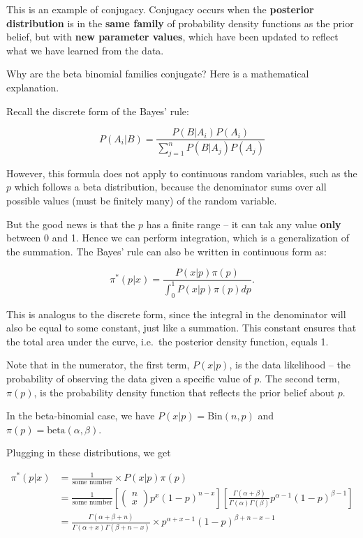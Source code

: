 \documentclass[]{book}
\theoremstyle{definition}
\theoremstyle{definition}
\theoremstyle{remark}
\begin{document}
This is an example of conjugacy. Conjugacy occurs when the
\textbf{posterior distribution} is in the \textbf{same family} of
probability density functions as the prior belief, but with \textbf{new
parameter values}, which have been updated to reflect what we have
learned from the data.

Why are the beta binomial families conjugate? Here is a mathematical
explanation.

Recall the discrete form of the Bayes' rule:

\[P(A_i|B) = \frac{P(B|A_i)P(A_i)}{\sum^n_{j=1}P(B|A_j)P(A_j)}\]

However, this formula does not apply to continuous random variables,
such as the \(p\) which follows a beta distribution, because the
denominator sums over all possible values (must be finitely many) of the
random variable.

But the good news is that the \(p\) has a finite range -- it can tak any
value \textbf{only} between 0 and 1. Hence we can perform integration,
which is a generalization of the summation. The Bayes' rule can also be
written in continuous form as:

\[\pi^*(p|x) = \frac{P(x|p)\pi(p)}{\int^1_0 P(x|p)\pi(p) dp}.\]

This is analogus to the discrete form, since the integral in the
denominator will also be equal to some constant, just like a summation.
This constant ensures that the total area under the curve, i.e.~the
posterior density function, equals 1.

Note that in the numerator, the first term, \(P(x|p)\), is the data
likelihood -- the probability of observing the data given a specific
value of \(p\). The second term, \(\pi(p)\), is the probability density
function that reflects the prior belief about \(p\).

In the beta-binomial case, we have \(P(x|p)=\text{Bin}(n,p)\) and
\(\pi(p)=\text{beta}(\alpha,\beta)\).

Plugging in these distributions, we get

\[\begin{aligned}
\pi^*(p|x) &= \frac{1}{\text{some number}} \times P(x|p)\pi(p) \\
&= \frac{1}{\text{some number}} [\left( \begin{array}{c} n \\ x \end{array} \right) p^x (1-p)^{n-x}] [\frac{\Gamma(\alpha+\beta)}{\Gamma(\alpha)\Gamma(\beta)} p^{\alpha-1} (1-p)^{\beta-1}] \\
&= \frac{\Gamma(\alpha+\beta+n)}{\Gamma(\alpha+x)\Gamma(\beta+n-x)} \times p^{\alpha+x-1} (1-p)^{\beta+n-x-1}
\end{aligned}\]
\end{document}
